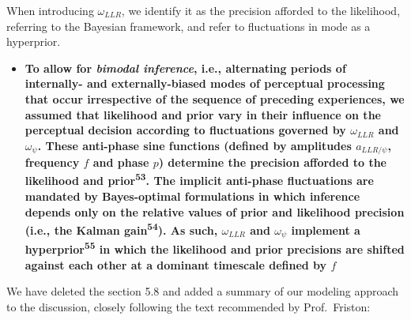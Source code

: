\documentclass[
]{article}
\providecommand{\tightlist}{%
  \setlength{\itemsep}{0pt}\setlength{\parskip}{0pt}}
\begin{document}
When introducing \(\omega_{LLR}\), we identify it as the precision
afforded to the likelihood, referring to the Bayesian framework, and
refer to fluctuations in mode as a hyperprior.

\begin{itemize}
\tightlist
\item
  \textbf{To allow for \emph{bimodal inference}, i.e., alternating
  periods of internally- and externally-biased modes of perceptual
  processing that occur irrespective of the sequence of preceding
  experiences, we assumed that likelihood and prior vary in their
  influence on the perceptual decision according to fluctuations
  governed by \(\omega_{LLR}\) and \(\omega_{\psi}\). These anti-phase
  sine functions (defined by amplitudes \(a_{LLR/\psi}\), frequency
  \(f\) and phase \(p\)) determine the precision afforded to the
  likelihood and prior\textsuperscript{53}. The implicit anti-phase
  fluctuations are mandated by Bayes-optimal formulations in which
  inference depends only on the relative values of prior and likelihood
  precision (i.e., the Kalman gain\textsuperscript{54}). As such,
  \(\omega_{LLR}\) and \(\omega_{\psi}\) implement a
  hyperprior\textsuperscript{55} in which the likelihood and prior
  precisions are shifted against each other at a dominant timescale
  defined by \(f\)}
\end{itemize}

We have deleted the section 5.8 and added a summary of our modeling
approach to the discussion, closely following the text recommended by
Prof.~Friston:
\end{document}
